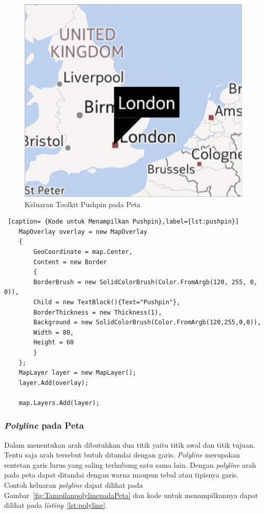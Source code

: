 \begin{figure}[h]
	\centering
		\includegraphics[scale=0.5]{Gambar/toolkit_pushpin}
	\caption{Keluaran Toolkit Pushpin pada Peta \cite{Manning}}
	\label{fig:toolkit_pushpin}
\end{figure}

\begin{lstlisting} [caption= {Kode untuk Menampilkan Pushpin},label={lst:pushpin}]
	MapOverlay overlay = new MapOverlay
	{
		GeoCoordinate = map.Center,
		Content = new Border
		{
		BorderBrush = new SolidColorBrush(Color.FromArgb(120, 255, 0, 0)),
		Child = new TextBlock(){Text="Pushpin"},
		BorderThickness = new Thickness(1),
		Background = new SolidColorBrush(Color.FromArgb(120,255,0,0)),
		Width = 80,
		Height = 60
		}
	};
	MapLayer layer = new MapLayer();
	layer.Add(overlay);

	map.Layers.Add(layer);
\end{lstlisting}

\subsubsection{\textit{Polyline} pada Peta}
\label{subsubsec:Polyline pada Peta}
\hspace{0.5cm} Dalam menentukan arah dibutuhkan dua titik yaitu titik awal dan titik tujuan. Tentu saja arah tersebut butuh ditandai dengan garis. \textit{Polyline} merupakan rentetan garis lurus yang saling terhubung satu sama lain. Dengan \textit{polyline} arah pada peta dapat ditandai dengan warna maupun tebal atau tipisnya garis. Contoh keluaran \textit{polyline} dapat dilihat pada Gambar~\ref{fig:TampilanpolylinepadaPeta} dan kode untuk menampilkannya dapat dilihat pada \textit{listing}~\ref{lst:polyline}.

